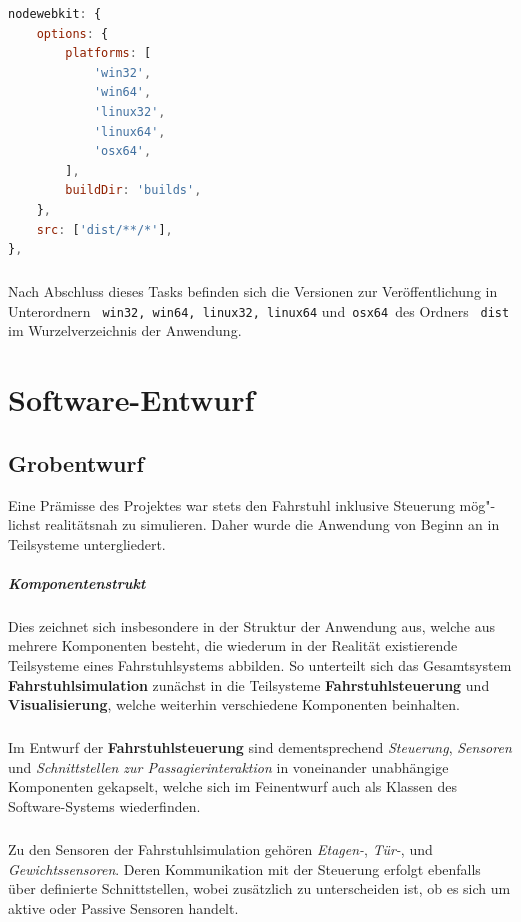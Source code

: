 \begin{lstlisting}[language=JavaScript,label=JS:grunt_webkit_config,caption=grunt nodewebkit-Konfiguration]
nodewebkit: {
	options: {
		platforms: [
			'win32',
			'win64',
			'linux32',
			'linux64',
			'osx64',
		],
		buildDir: 'builds',
	},
	src: ['dist/**/*'],
},
\end{lstlisting}

\paragraph{}Nach Abschluss dieses Tasks befinden sich die Versionen zur Veröffentlichung in Unterordnern \texttt{ win32, win64, linux32, linux64} und\texttt{ osx64 }des Ordners \texttt{ dist } im Wurzelverzeichnis der Anwendung.

\chapter{Software-Entwurf}
\section{Grobentwurf}
Eine Prämisse des Projektes war stets den Fahrstuhl inklusive Steuerung mög"-lichst realitätsnah zu simulieren. Daher wurde die Anwendung von Beginn an in Teilsysteme untergliedert.

\paragraph{Komponentenstrukt}
Dies zeichnet sich insbesondere in der Struktur der Anwendung aus, welche aus mehrere Komponenten besteht, die wiederum in der Realität existierende Teilsysteme eines Fahrstuhlsystems abbilden.
So unterteilt sich das Gesamtsystem \textbf{Fahrstuhlsimulation} zunächst in die Teilsysteme \textbf{Fahrstuhlsteuerung} und \textbf{Visualisierung}, welche weiterhin verschiedene Komponenten beinhalten.

\paragraph{}
Im Entwurf der \textbf{Fahrstuhlsteuerung} sind dementsprechend \textit{Steuerung}, \textit{Sensoren} und \textit{Schnittstellen zur Passagierinteraktion} in voneinander unabhängige Komponenten gekapselt, welche sich im Feinentwurf auch als Klassen des Software-Systems wiederfinden.

\paragraph{}
Zu den Sensoren der Fahrstuhlsimulation gehören \textit{Etagen-}, \textit{Tür-}, und \textit{Gewichtssensoren}.
Deren Kommunikation mit der Steuerung erfolgt ebenfalls über definierte Schnittstellen, wobei zusätzlich zu unterscheiden ist, ob es sich um aktive oder Passive Sensoren handelt.

